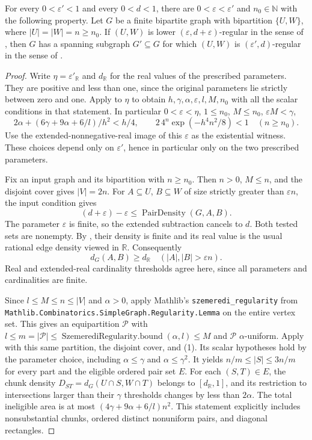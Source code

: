 \begin{lemma}
For every $0<\varepsilon'<1$ and every $0<d<1$, there are $0<\varepsilon<\varepsilon'$ and $n_0\in\mathbb N$ with the following property.  Let $G$ be a finite bipartite graph with bipartition $\{U,W\}$, where $|U|=|W|=n\geq n_0$.  If $(U,W)$ is lower $(\varepsilon,d+\varepsilon)$-regular in the sense of , then $G$ has a spanning subgraph $G'\subseteq G$ for which $(U,W)$ is $(\varepsilon',d)$-regular in the sense of .
\end{lemma}
\begin{proof}
Write $\eta=\varepsilon'_{\mathbb R}$ and $d_{\mathbb R}$ for the real
values of the prescribed parameters. They are positive and less than one,
since the original parameters lie strictly between zero and one. Apply
 to $\eta$ to obtain
$h,\gamma,\alpha,\varepsilon,l,M,n_0$ with all the scalar conditions
in that statement. In particular $0<\varepsilon<\eta$, $1\leq n_0$,
$M\leq n_0$, $\varepsilon M<\gamma$,
\[
 2\alpha+(6\gamma+9\alpha+6/l)/h^2<h/4,\qquad
 2\,4^n\exp(-h^4n^2/8)<1\quad(n\geq n_0).
\]
Use the extended-nonnegative-real image of this $\varepsilon$ as the
existential witness. These choices depend only on $\varepsilon'$, hence
in particular only on the two prescribed parameters.

Fix an input graph and its bipartition with $n\geq n_0$. Then
$n>0$, $M\leq n$, and the disjoint cover gives $|V|=2n$.
For $A\subseteq U$, $B\subseteq W$ of size strictly greater than
$\varepsilon n$, the input  condition gives
\[
 (d+\varepsilon)-\varepsilon\leq\operatorname{PairDensity}(G,A,B).
\]
The parameter $\varepsilon$ is finite, so the extended subtraction
cancels to $d$. Both tested sets are nonempty. By
, their density is finite and its real value
is the usual rational edge density viewed in $\mathbb R$.
Consequently
\[
 d_G(A,B)\geq d_{\mathbb R}\quad
       (|A|,|B|>\varepsilon n).                         \tag{1}
\]
Real and extended-real cardinality thresholds agree here, since
all parameters and cardinalities are finite.

Since $l\leq M\leq n\leq |V|$ and $\alpha>0$, apply
Mathlib's \texttt{szemeredi\_regularity} from
\texttt{Mathlib.Combinatorics.SimpleGraph.Regularity.Lemma} on the entire vertex set.
This gives an equipartition $\mathcal P$ with
$l\leq m=|\mathcal P|\leq
\operatorname{SzemerediRegularity.bound}(\alpha,l)\leq M$ and
$\mathcal P$ $\alpha$-uniform. Apply
 with this same partition,
the disjoint cover, and (1). Its scalar hypotheses hold by the
parameter choice, including $\alpha\leq\gamma$ and
$\alpha\leq\gamma^2$. It yields $n/m\leq|S|\leq3n/m$ for every
part and the eligible ordered pair set $E$. For each $(S,T)\in E$,
the chunk density $D_{ST}=d_G(U\cap S,W\cap T)$ belongs to
$[d_{\mathbb R},1]$, and its restriction to intersections larger
than their $\gamma$ thresholds changes by less than $2\alpha$.
The total ineligible area is at most
$(4\gamma+9\alpha+6/l)n^2$. This statement explicitly includes
nonsubstantial chunks, ordered distinct nonuniform pairs, and
diagonal rectangles.


\end{proof}
